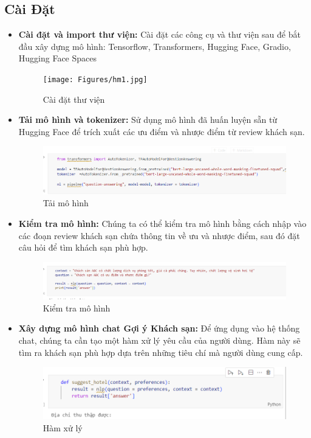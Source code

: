 \subsection{Cài Đặt}
\begin{itemize}
    \item \textbf{Cài đặt và import thư viện:} Cài đặt các công cụ và thư viện sau để bắt đầu xây dựng mô hình: Tensorflow, Transformers, Hugging Face, Gradio, Hugging Face Spaces
     \begin{figure}[H] %
        \centering
        \texttt{[image: Figures/hm1.jpg]}
        \caption{Cài đặt thư viện}
        \label{fig:iot}
    \end{figure}



     \item \textbf{Tải mô hình và tokenizer:} Sử dụng mô hình đã huấn luyện sẵn từ Hugging Face để trích xuất các ưu điểm và nhược điểm từ review khách sạn.
    \begin{figure}[H] %
        \centering
        \includegraphics[width=1.3\linewidth]{Figures/hm2.png}
        \caption{Tải mô hình}
        \label{fig:iot}
    \end{figure}

         \item \textbf{Kiểm tra mô hình:} Chúng ta có thể kiểm tra mô hình bằng cách nhập vào các đoạn review khách sạn chứa thông tin về ưu và nhược điểm, sau đó đặt câu hỏi để tìm khách sạn phù hợp.
    \begin{figure}[H] %
        \centering
        \includegraphics[width=1.3\linewidth]{Figures/hm3.png}
        \caption{Kiểm tra mô hình}
        \label{fig:iot}
    \end{figure}

      \item \textbf{Xây dựng mô hình chat Gợi ý Khách sạn:} Để ứng dụng vào hệ thống chat, chúng ta cần tạo một hàm xử lý yêu cầu của người dùng. Hàm này sẽ tìm ra khách sạn phù hợp dựa trên những tiêu chí mà người dùng cung cấp.
    \begin{figure}[H] %
        \centering
        \includegraphics[width=1.0\linewidth]{Figures/hm4.png}
        \caption{Hàm xử lý}
        \label{fig:iot}
    \end{figure}


\end{itemize}
